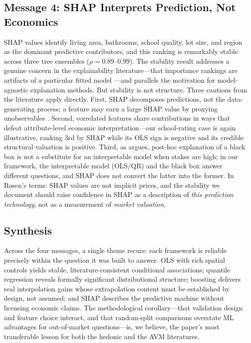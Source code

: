\subsection{Message 4: SHAP Interprets Prediction, Not Economics}

SHAP values identify living area, bathrooms, school quality, lot size, and region
as the dominant predictive contributors, and this ranking is remarkably stable
across three tree ensembles ($\rho = 0.89$--$0.99$). The stability result addresses
a genuine concern in the explainability literature---that importance rankings are
artifacts of a particular fitted model \citep{ribeiro2016should}---and parallels
the motivation for model-agnostic explanation methods. But stability is not
structure. Three cautions from the literature apply directly. First, SHAP
decomposes predictions, not the data-generating process; a feature may earn a
large SHAP value by proxying unobservables \citep{lundberg2017unified,
lundberg2020local}. Second, correlated features share contributions in ways that
defeat attribute-level economic interpretation---our school-rating case is again
illustrative, ranking 3rd by SHAP while its OLS sign is negative and its credible
structural valuation \citep{black1999better, bayer2007unified} is positive.
Third, as \citet{rudin2019stop} argues, post-hoc explanation of a black box is not
a substitute for an interpretable model when stakes are high; in our framework,
the interpretable model (OLS/QR) and the black box answer different questions,
and SHAP does not convert the latter into the former. In Rosen's terms: SHAP
values are not implicit prices, and the stability we document should raise
confidence in SHAP as a description of \emph{this prediction technology}, not as
a measurement of \emph{market valuation}.

\subsection{Synthesis}

Across the four messages, a single theme recurs: each framework is reliable
precisely within the question it was built to answer. OLS with rich spatial
controls yields stable, literature-consistent conditional associations; quantile
regression reveals formally significant distributional structure; boosting
delivers real interpolation gains whose extrapolation content must be established
by design, not assumed; and SHAP describes the predictive machine without
licensing economic claims. The methodological corollary---that validation design
and feature choice interact, and that random-split comparisons overstate ML
advantages for out-of-market questions---is, we believe, the paper's most
transferable lesson for both the hedonic and the AVM literatures.
